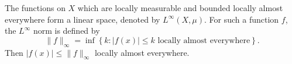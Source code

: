 The functions on $X$ which are locally measurable and bounded locally almost everywhere form a linear space, denoted by $L^\infty(X, \mu)$. For such a function $f$, the $L^\infty$ norm is defined by
$$\|f\|_\infty = \inf \left\{k : |f(x)| \leq k \text{ locally almost everywhere}\right\}.$$
Then $|f(x)| \leq \|f\|_\infty$ locally almost everywhere.

